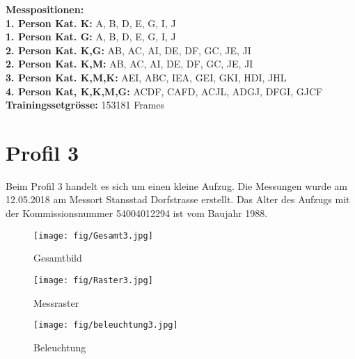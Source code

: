  \textbf{Messpositionen:}\\
\textbf{1. Person Kat. K:} A, B, D, E, G, I, J\\
\textbf{1. Person Kat. G:} A, B, D, E, G, I, J\\
\textbf{2. Person Kat. K,G:} AB, AC, AI, DE, DF, GC, JE, JI   \\
\textbf{2. Person Kat. K,M:} AB, AC, AI, DE, DF, GC, JE, JI   \\
\textbf{3. Person Kat. K,M,K:} AEI, ABC, IEA, GEI, GKI, HDI, JHL \\
\textbf{4. Person Kat, K,K,M,G:} ACDF, CAFD, ACJL, ADGJ, DFGI, GJCF \\
\textbf{Trainingssetgrösse:} 153181 Frames


	\newpage
\section{Profil 3}
Beim Profil 3 handelt es sich um einen kleine Aufzug. Die Messungen wurde am 12.05.2018 am Messort Stansstad Dorfstrasse erstellt. Das Alter des Aufzugs mit der Kommissionsnummer 54004012294 ist vom Baujahr 1988.

		
		\begin{figure}[!ht]
	\centering
	\begin{minipage}[b]{0.3\linewidth}
		\centering
		\texttt{[image: fig/Gesamt3.jpg]}
		\caption{Gesamtbild}
		\label{fig:profilAnhang7}
	\end{minipage}
	\begin{minipage}[b]{0.3\linewidth}
		\centering
		\texttt{[image: fig/Raster3.jpg]}
		\caption{Messraster}
		\label{fig:profilAnhang8}
	\end{minipage}
	\begin{minipage}[b]{0.3\linewidth}
		\centering
		\texttt{[image: fig/beleuchtung3.jpg]}
		\caption{Beleuchtung}
		\label{fig:profilAnhang9}
	\end{minipage}
\end{figure}

